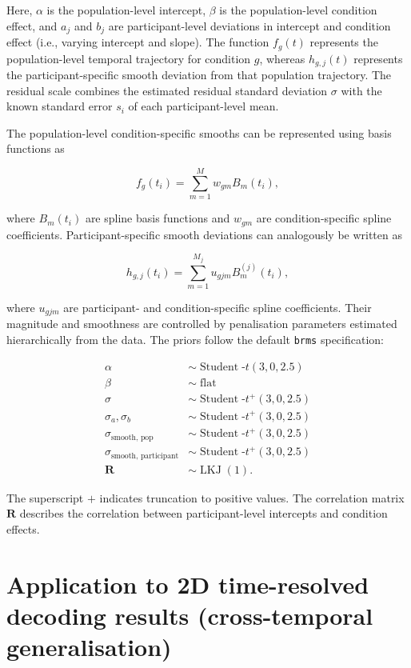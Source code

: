 \documentclass[
  doc,
  floatsintext,
  longtable,
  a4paper,
  nolmodern,
  notxfonts,
  notimes,
  colorlinks=true,linkcolor=blue,citecolor=blue,urlcolor=blue]{apa7}
\begin{document}
Here, \(\alpha\) is the population-level intercept, \(\beta\) is the
population-level condition effect, and \(a_j\) and \(b_j\) are
participant-level deviations in intercept and condition effect (i.e.,
varying intercept and slope). The function \(f_g(t)\) represents the
population-level temporal trajectory for condition \(g\), whereas
\(h_{g,j}(t)\) represents the participant-specific smooth deviation from
that population trajectory. The residual scale combines the estimated
residual standard deviation \(\sigma\) with the known standard error
\(s_i\) of each participant-level mean.

The population-level condition-specific smooths can be represented using
basis functions as

\[
f_g(t_i)
=
\sum_{m=1}^{M}
w_{gm} B_m(t_i),
\]

where \(B_m(t_i)\) are spline basis functions and \(w_{gm}\) are
condition-specific spline coefficients. Participant-specific smooth
deviations can analogously be written as

\[
h_{g,j}(t_i)
=
\sum_{m=1}^{M_j}
u_{gjm} B^{(j)}_m(t_i),
\]

where \(u_{gjm}\) are participant- and condition-specific spline
coefficients. Their magnitude and smoothness are controlled by
penalisation parameters estimated hierarchically from the data. The
priors follow the default \texttt{brms} specification:

\[
\begin{aligned}
\alpha &\sim \operatorname{Student}\text{-}t(3,0,2.5) \\[4pt]
\beta &\sim \operatorname{flat} \\[4pt]
\sigma &\sim \operatorname{Student}\text{-}t^+(3,0,2.5) \\[4pt]
\sigma_a, \sigma_b &\sim \operatorname{Student}\text{-}t^+(3,0,2.5) \\[4pt]
\sigma_{\text{smooth, pop}} &\sim \operatorname{Student}\text{-}t^+(3,0,2.5) \\[4pt]
\sigma_{\text{smooth, participant}} &\sim \operatorname{Student}\text{-}t^+(3,0,2.5) \\[4pt]
\mathbf{R} &\sim \operatorname{LKJ}(1).
\end{aligned}
\]

The superscript \(+\) indicates truncation to positive values. The
correlation matrix \(\mathbf{R}\) describes the correlation between
participant-level intercepts and condition effects.

\newpage

\section{Application to 2D time-resolved decoding results
(cross-temporal generalisation)}\label{apx-2D}
\end{document}
